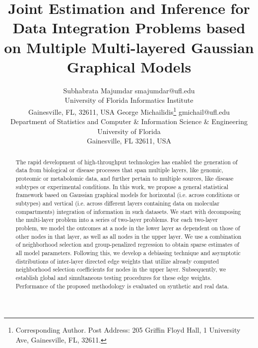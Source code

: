 \documentclass[twoside,11pt]{article}
\numberwithin{equation}{section}
\begin{document}
\newtheorem{Theorem}{theorem}[section]
\newtheorem{Lemma}[Theorem]{Lemma}
\newtheorem{Corollary}[Theorem]{Corollary}
\newtheorem{Proposition}[Theorem]{Proposition}
\newtheorem{Conjecture}[Theorem]{Conjecture}
\theoremstyle{definition} \newtheorem{Definition}[Theorem]{Definition}
\newtheorem{Example}{Example}[section]
\newtheorem{Algorithm}{Algorithm}
\newtheorem{Remark}{Remark}

\title{Joint Estimation and Inference for Data Integration Problems based on Multiple Multi-layered Gaussian Graphical Models}
\date{}
\author{\name Subhabrata Majumdar \email smajumdar@ufl.edu \\
       \addr University of Florida Informatics Institute\\
       Gainesville, FL, 32611, USA
      \AND
      \name George Michailidis\thanks{Corresponding Author. Post Address: 205 Griffin Floyd Hall, 1 University Ave, Gainesville, FL, 32611.} \email gmichail@ufl.edu \\
      \addr Department of Statistics and Computer \& Information Science \& Engineering \\
      University of Florida \\
      Gainesville, FL 32611, USA 
       }

\editor{}
\maketitle

\begin{abstract} %
The rapid development of high-throughput technologies has enabled the generation of data from biological or disease processes that span multiple layers, like genomic, proteomic or metabolomic data, and further pertain to multiple sources, like disease subtypes or experimental conditions. In this work, we propose a general statistical framework based on Gaussian graphical models for horizontal (i.e. across conditions or subtypes) and vertical (i.e. across different layers containing data on molecular compartments) integration of information in such datasets. We start with decomposing the multi-layer problem into a series of two-layer problems. For each two-layer problem, we model the outcomes at a node in the lower layer as dependent on those of other nodes in that layer, as well as all nodes in the upper layer. We use a combination of neighborhood selection and group-penalized regression to obtain sparse estimates of all model parameters. Following this, we develop a debiasing technique and asymptotic distributions of inter-layer directed edge weights that utilize already computed neighborhood selection coefficients for nodes in the upper layer. Subsequently, we establish global and simultaneous testing procedures for these edge weights. Performance of the proposed methodology is evaluated on synthetic and real data.
\end{abstract}
\end{document}
